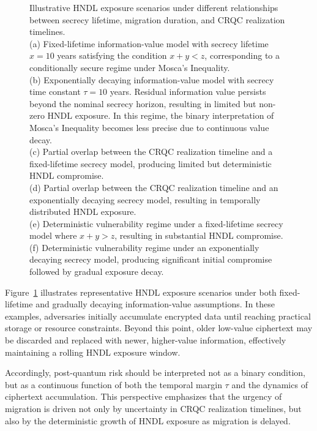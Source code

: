 \documentclass[11pt,a4paper]{article}
\begin{document}
\begin{figure}[htbp]
    \caption{ Illustrative HNDL exposure scenarios under different relationships between secrecy lifetime, migration duration, and CRQC realization timelines.\\
    (a) Fixed-lifetime information-value model with secrecy lifetime $x=10$ years satisfying the condition $x+y<z$, corresponding to a conditionally secure regime under Mosca’s Inequality.\\
    (b) Exponentially decaying information-value model with secrecy time constant $\tau = 10$ years. Residual information value persists beyond the nominal secrecy horizon, resulting in limited but non-zero HNDL exposure. In this regime, the binary interpretation of Mosca’s Inequality becomes less precise due to continuous value decay.\\
    (c) Partial overlap between the CRQC realization timeline and a fixed-lifetime secrecy model, producing limited but deterministic HNDL compromise.\\
    (d) Partial overlap between the CRQC realization timeline and an exponentially decaying secrecy model, resulting in temporally distributed HNDL exposure.\\
    (e) Deterministic vulnerability regime under a fixed-lifetime secrecy model where $x+y>z$, resulting in substantial HNDL compromise.\\
    (f) Deterministic vulnerability regime under an exponentially decaying secrecy model, producing significant initial compromise followed by gradual exposure decay.}

    \label{fig:hndl_scenarios}

\end{figure}

Figure~\ref{fig:hndl_scenarios} illustrates representative HNDL exposure scenarios under both fixed-lifetime and gradually decaying information-value assumptions. In these examples, adversaries initially accumulate encrypted data until reaching practical storage or resource constraints. Beyond this point, older low-value ciphertext may be discarded and replaced with newer, higher-value information, effectively maintaining a rolling HNDL exposure window.

Accordingly, post-quantum risk should be interpreted not as a binary condition, but as a continuous function of both the temporal margin $\tau$ and the dynamics of ciphertext accumulation. This perspective emphasizes that the urgency of migration is driven not only by uncertainty in CRQC realization timelines, but also by the deterministic growth of HNDL exposure as migration is delayed.
\end{document}
